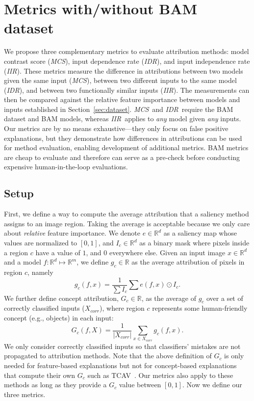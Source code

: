 \documentclass[twoside]{article}
\newcommand{\MCS}{\textit{MCS}}
\newcommand{\IDR}{\textit{IDR}}
\newcommand{\IIR}{\textit{IIR}}
\begin{document}
\section{Metrics with/without BAM dataset} \label{sec:metric}
We propose three complementary metrics to evaluate attribution methods: model contrast score (\MCS), input dependence rate (\IDR), and input independence rate (\IIR). These metrics measure the difference in attributions between two models given the same input (\MCS), between two different inputs to the same model (\IDR), and between two functionally similar inputs (\IIR). The measurements can then be compared against the relative feature importance between models and inputs established in Section~\ref{sec:dataset}. \MCS~and \IDR~require the BAM dataset and BAM models, whereas \IIR~applies to \textit{any} model given \textit{any} inputs. Our metrics are by no means exhaustive---they only focus on false positive explanations, but they demonstrate how differences in attributions can be used for method evaluation, enabling development of additional metrics. BAM metrics are cheap to evaluate and therefore can serve as a pre-check before conducting expensive human-in-the-loop evaluations.

\subsection{Setup}
First, we define a way to compute the average attribution that a saliency method assigns to an image region. Taking the average is acceptable because we only care about \textit{relative} feature importance. We denote $e \in \mathbb{R}^d$ as a saliency map whose values are normalized to $[0, 1]$, and $I_c \in \mathbb{R}^d$ as a binary mask where pixels inside a region $c$ have a value of $1$, and $0$ everywhere else. Given an input image $x \in \mathbb{R}^d$ and a model $f: \mathbb{R}^d \mapsto \mathbb{R}^m$, we define $g_c  \in \mathbb{R}$ as the average attribution of pixels in region $c$, namely
$$
  g_c(f, x) = \frac{1}{\sum I_c}\sum{e(f, x) \odot I_c}.
$$
We further define concept attribution, $G_c \in \mathbb{R}$, as the average of $g_c$ over a set of correctly classified inputs ($X_{\textit{corr}}$), where region $c$ represents some human-friendly concept (e.g., objects) in each input:
$$
  G_c(f, X) = \frac{1}{|X_{\textit{corr}}|}\sum\limits_{x \in X_{\textit{corr}}}{g_c(f, x)}.
$$
We only consider correctly classified inputs so that classifiers' mistakes are not propagated to attribution methods. Note that the above definition of $G_c$ is only needed for feature-based explanations but not for concept-based explanations that compute their own $G_c$ such as TCAV~\citep{Kim18}. Our metrics also apply to these methods as long as they provide a $G_c$ value between $[0, 1]$. Now we define our three metrics.
\end{document}
